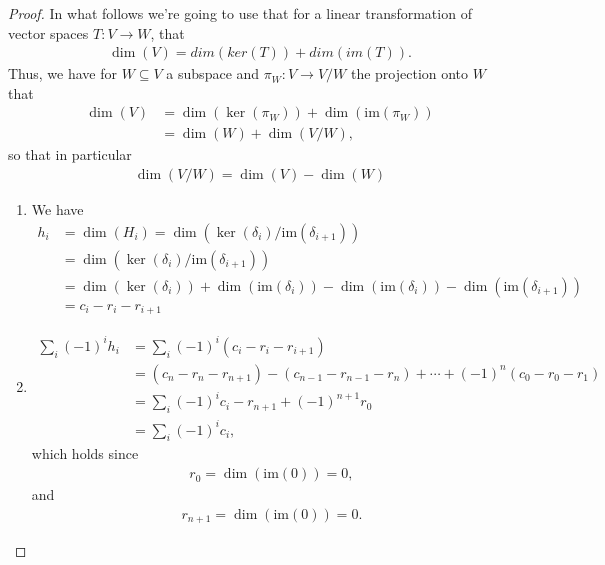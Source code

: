 \documentclass[12pt]{extarticle}
\newcommand{\im}{\text{im}}
\newcommand{\<}{\langle}
\renewcommand{\>}{\rangle}
\theoremstyle{definition}
\begin{document}
\begin{proof}
  In what follows we're going to use that for a linear transformation of vector spaces $T:V \to W$, that 
  \begin{align*}
    \dim(V) = dim(ker(T)) + dim(im(T)).
  \end{align*}
  Thus, we have for $W \subseteq V$ a subspace and $\pi_W : V \to V/W$ the projection onto $W$ that 
  \begin{align*}
    \dim(V)
    &= \dim(\ker(\pi_W)) + \dim(\im(\pi_W)) \\
    &= \dim(W) + \dim(V/W),
  \end{align*}
  so that in particular
  \begin{align*}
    \dim(V/W) = \dim(V) - \dim(W)
  \end{align*}
  
  

  
  \begin{enumerate}
  \item
    We have 
    \begin{align*}
      h_i
      &= \dim(H_i) = \dim (\ker(\delta_i)/\im(\delta_{i+1})) \\
      &= \dim (\ker(\delta_i)/\im(\delta_{i+1})) \\
      &= \dim (\ker(\delta_i)) + \dim(\im(\delta_i)) - \dim(\im(\delta_i)) - \dim(\im(\delta_{i+1}))  \\
      &=  c_i - r_i - r_{i+1}
    \end{align*}
  \item
    \begin{align*}
      \sum\limits_i (-1)^i h_i &= \sum\limits_i (-1)^i (c_i - r_i - r_{i+1})  \\
      &= (c_n - r_n - r_{n+1}) - (c_{n-1} - r_{n-1} - r_n) + \cdots + (-1)^n(c_0 - r_0 - r_1) \\
      &= \sum \limits_i (-1)^i c_i - r_{n+1} + (-1)^{n+1} r_0 \\
      &= \sum \limits_i (-1)^i c_i,
    \end{align*}
    which holds since
    \begin{align*}
      r_0 = \dim(\im(0)) = 0,
    \end{align*}
    and
    \begin{align*}
      r_{n+1} = \dim(\im(0)) = 0.
    \end{align*}
  \end{enumerate}
\end{proof}
\end{document}
